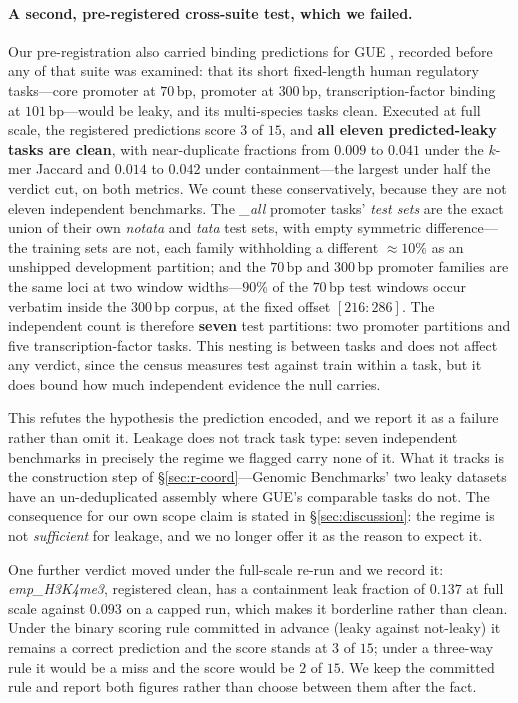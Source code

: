 \documentclass[webpdf,modern,large,namedate]{oup-authoring-template}%
\begin{document}
\paragraph{A second, pre-registered cross-suite test, which we failed.}
Our pre-registration also carried binding predictions for GUE \citep{zhou2023dnabert2}, recorded before any of that suite was examined: that its short fixed-length human regulatory tasks---core promoter at $70$\,bp, promoter at $300$\,bp, transcription-factor binding at $101$\,bp---would be leaky, and its multi-species tasks clean. Executed at full scale, the registered predictions score $3$ of $15$, and \textbf{all eleven predicted-leaky tasks are clean}, with near-duplicate fractions from $0.009$ to $0.041$ under the $k$-mer Jaccard and $0.014$ to $0.042$ under containment---the largest under half the verdict cut, on both metrics. We count these conservatively, because they are not eleven independent benchmarks. The \textit{\_all} promoter tasks' \emph{test sets} are the exact union of their own \textit{notata} and \textit{tata} test sets, with empty symmetric difference---the training sets are not, each family withholding a different ${\approx}10\%$ as an unshipped development partition; and the $70$\,bp and $300$\,bp promoter families are the same loci at two window widths---$90\%$ of the $70$\,bp test windows occur verbatim inside the $300$\,bp corpus, at the fixed offset $[216{:}286]$. The independent count is therefore \textbf{seven} test partitions: two promoter partitions and five transcription-factor tasks. This nesting is between tasks and does not affect any verdict, since the census measures test against train within a task, but it does bound how much independent evidence the null carries.

This refutes the hypothesis the prediction encoded, and we report it as a failure rather than omit it. Leakage does not track task type: seven independent benchmarks in precisely the regime we flagged carry none of it. What it tracks is the construction step of \S\ref{sec:r-coord}---Genomic Benchmarks' two leaky datasets have an un-deduplicated assembly where GUE's comparable tasks do not. The consequence for our own scope claim is stated in \S\ref{sec:discussion}: the regime is not \emph{sufficient} for leakage, and we no longer offer it as the reason to expect it.

One further verdict moved under the full-scale re-run and we record it: \textit{emp\_H3K4me3}, registered clean, has a containment leak fraction of $0.137$ at full scale against $0.093$ on a capped run, which makes it borderline rather than clean. Under the binary scoring rule committed in advance (leaky against not-leaky) it remains a correct prediction and the score stands at $3$ of $15$; under a three-way rule it would be a miss and the score would be $2$ of $15$. We keep the committed rule and report both figures rather than choose between them after the fact.
\end{document}
